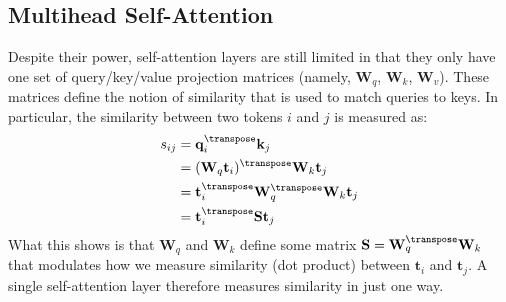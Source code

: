 

\subsection{Multihead Self-Attention}
Despite their power, self-attention layers are still limited in that they only have one set of query/key/value projection matrices (namely, $\mathbf{W}_q$, $\mathbf{W}_k$, $\mathbf{W}_v$). These matrices define the notion of similarity that is used to match queries to keys. In particular, the similarity between two tokens $i$ and $j$ is measured as:
\begin{align}
     s_{ij} &= \mathbf{q}_i^\transpose \mathbf{k}_j\\
     &= (\mathbf{W}_q \mathbf{t}_i)^\transpose \mathbf{W}_k \mathbf{t}_j\\
     &= \mathbf{t}_i^\transpose\mathbf{W}_q^\transpose \mathbf{W}_k \mathbf{t}_j\\
     &= \mathbf{t}_i^\transpose\mathbf{S}\mathbf{t}_j
\end{align}
What this shows is that $\mathbf{W}_q$ and $\mathbf{W}_k$ define some matrix $\mathbf{S} = \mathbf{W}_q^\transpose \mathbf{W}_k$ that modulates how we measure similarity (dot product) between $\mathbf{t}_i$ and $\mathbf{t}_j$. A single self-attention layer therefore measures similarity in just one way.

